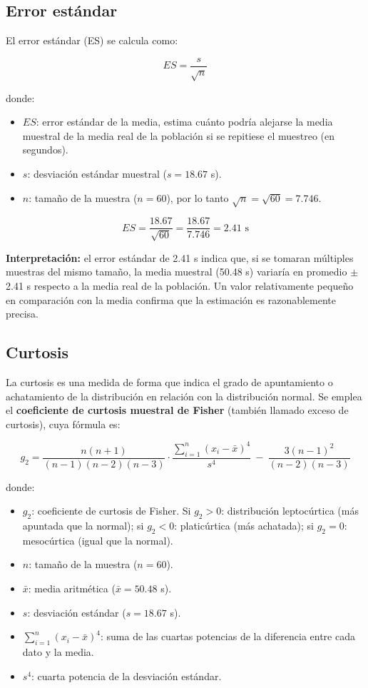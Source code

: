 \documentclass[12pt,letterpaper]{article}
\begin{document}
\subsection{Error estándar}

El error estándar (ES) se calcula como:

\[
ES=\frac{s}{\sqrt{n}}
\]

donde:
\begin{itemize}[leftmargin=1.2cm]
    \item $ES$: error estándar de la media, estima cuánto podría alejarse la media muestral de la media real de la población si se repitiese el muestreo (en segundos).
    \item $s$: desviación estándar muestral ($s = 18.67$ s).
    \item $n$: tamaño de la muestra ($n = 60$), por lo tanto $\sqrt{n} = \sqrt{60} = 7.746$.
\end{itemize}

\[
ES=\frac{18.67}{\sqrt{60}}=\frac{18.67}{7.746}=2.41 \text{ s}
\]

\textbf{Interpretación:} el error estándar de 2.41 s indica que, si se tomaran múltiples muestras del mismo tamaño, la media muestral (50.48 s) variaría en promedio $\pm$2.41 s respecto a la media real de la población. Un valor relativamente pequeño en comparación con la media confirma que la estimación es razonablemente precisa.

\subsection{Curtosis}

La curtosis es una medida de forma que indica el grado de apuntamiento o achatamiento de la distribución en relación con la distribución normal. Se emplea el \textbf{coeficiente de curtosis muestral de Fisher} (también llamado exceso de curtosis), cuya fórmula es:

\[
g_2 = \frac{n(n+1)}{(n-1)(n-2)(n-3)}\cdot\frac{\displaystyle\sum_{i=1}^{n}(x_i-\bar{x})^4}{s^4}
     \ -\ \frac{3(n-1)^2}{(n-2)(n-3)}
\]

donde:
\begin{itemize}[leftmargin=1.2cm]
    \item $g_2$: coeficiente de curtosis de Fisher. Si $g_2 > 0$: distribución leptocúrtica (más apuntada que la normal); si $g_2 < 0$: platicúrtica (más achatada); si $g_2 = 0$: mesocúrtica (igual que la normal).
    \item $n$: tamaño de la muestra ($n = 60$).
    \item $\bar{x}$: media aritmética ($\bar{x} = 50.48$ s).
    \item $s$: desviación estándar ($s = 18.67$ s).
    \item $\sum_{i=1}^{n}(x_i-\bar{x})^4$: suma de las cuartas potencias de la diferencia entre cada dato y la media.
    \item $s^4$: cuarta potencia de la desviación estándar.
\end{itemize}
\end{document}
